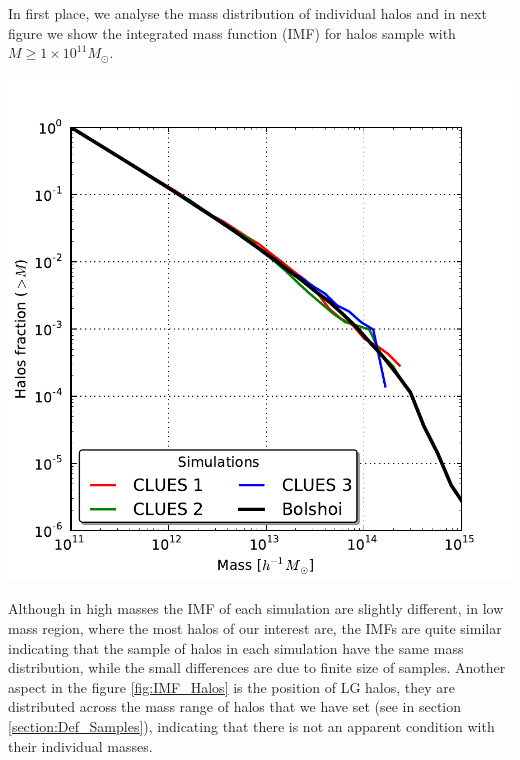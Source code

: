 \documentclass[usenatbib]{latex/mn2e}
\begin{document}
In first place, we analyse the mass distribution of individual halos and 
in next figure we show the integrated mass function (IMF) for halos sample
with $M \geq 1\times 10^{11} M_{\odot}$.


\begin{flushleft}
\begin{center}

\includegraphics[keepaspectratio=true,width=0.35\textheight]
{./figures/Halos_IMF.pdf}


\label{fig:IMF_Halos}
\vspace{0.1 cm}
\end{center}
\end{flushleft}


Although in high masses the IMF of each simulation are slightly different, 
in low mass region, where the most halos of our interest are, the IMFs are 
quite similar indicating that the sample of halos in each simulation have 
the same mass distribution, while the small differences are due to finite 
size of samples. Another aspect in the figure \ref{fig:IMF_Halos} is the 
position of LG halos, they are distributed across the mass range of halos 
that we have set (see in section \ref{section:Def_Samples}), indicating 
that there is not an apparent condition with their individual masses.
\end{document}

